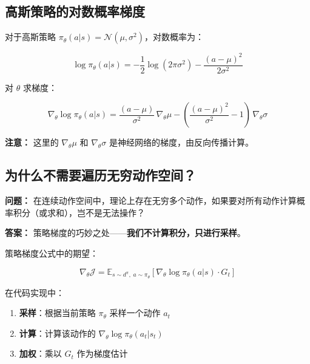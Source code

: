 \documentclass[12pt,a4paper]{article}
\newcommand{\E}{\mathbb{E}}
\newcommand{\grad}{\nabla}
\theoremstyle{noteplain}
\theoremstyle{noteexercise}
\begin{document}
\subsection{高斯策略的对数概率梯度}\label{ssec:gaussian-grad}

对于高斯策略 $\pi_\theta(a|s) = \mathcal{N}(\mu,\sigma^2)$，对数概率为：

\begin{equation}\label{eq:log-gaussian}
  \log \pi_\theta(a|s)
  = -\frac{1}{2}\log(2\pi\sigma^2) - \frac{(a-\mu)^2}{2\sigma^2}
\end{equation}

对 $\theta$ 求梯度：

\begin{equation}\label{eq:grad-log-gaussian}
  \grad_\theta \log \pi_\theta(a|s)
  = \frac{(a-\mu)}{\sigma^2}\,\grad_\theta\mu
  - \left( \frac{(a-\mu)^2}{\sigma^2} - 1 \right)\,\grad_\theta\sigma
\end{equation}

\textbf{注意：} 这里的 $\grad_\theta\mu$ 和 $\grad_\theta\sigma$ 是神经网络的梯度，由反向传播计算。

\subsection{为什么不需要遍历无穷动作空间？}\label{ssec:sampling}

\textbf{问题：} 在连续动作空间中，理论上存在无穷多个动作，如果要对所有动作计算概率积分（或求和），岂不是无法操作？

\textbf{答案：} 策略梯度的巧妙之处——\textbf{我们不计算积分，只进行采样}。

策略梯度公式中的期望：

\begin{equation}\label{eq:expectation-sampling}
  \grad_\theta \mathcal{J} = \E_{s\sim d^\pi,\; a\sim\pi_\theta}\!
  \left[ \grad_\theta \log \pi_\theta(a|s) \cdot G_t \right]
\end{equation}

在代码实现中：
\begin{enumerate}
  \setlength{\itemsep}{0.3em}
  \item \textbf{采样}：根据当前策略 $\pi_\theta$ 采样一个动作 $a_t$
  \item \textbf{计算}：计算该动作的 $\grad_\theta \log \pi_\theta(a_t|s_t)$
  \item \textbf{加权}：乘以 $G_t$ 作为梯度估计
\end{enumerate}
\end{document}

